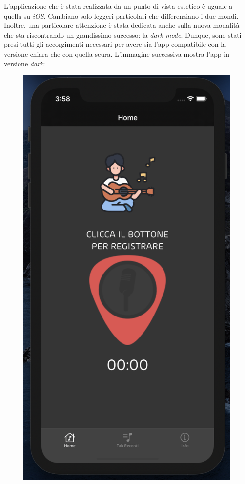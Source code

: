 \newline
L'applicazione che è stata realizzata da un punto di vista estetico è uguale a quella su \textit{iOS}. Cambiano solo leggeri particolari che differenziano i due mondi.\\
\newline
Inoltre, una particolare attenzione è stata dedicata anche sulla nuova modalità che sta riscontrando un grandissimo successo: la \textit{dark mode}. Dunque, sono stati presi tutti gli accorgimenti necessari per avere sia l'app compatibile con la versione chiara che con quella scura. L'immagine successiva mostra l'app in versione \textit{dark}:
\begin{figure}[H]
	\centering
	\includegraphics[scale=0.20]{./images/img10.png}
\end{figure}

